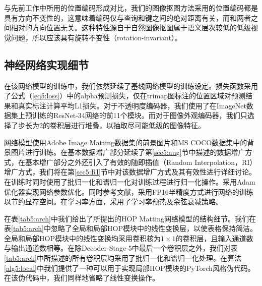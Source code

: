 与先前工作中所用的位置编码\cite{vaswani2017attention,dai2019transformer,ramachandran2019stand}形成对比，我们的图像抠图方法采用的位置编码都是具有方向不变性的，这意味着编码仅与查询和键之间的绝对距离有关，而和两者之间相对的方向位置无关。这种特性源自于自然图像抠图属于语义层次较低的低级视觉问题，所以应该具有旋转不变性（rotation-invariant）。

\subsection{神经网络实现细节}

在该网络模型的训练中，我们依然延续了基线网络模型的训练设定。损失函数采用了公式（\ref{eq5:loss}）中的alpha预测损失，仅在trimap图标注的位置区域对预测结果和真实标注计算平均L1损失。对于不透明度编码器，我们使用了在ImageNet数据集\cite{russakovsky2015imagenet}上预训练的ResNet-34网络\cite{he2016deep}的前11个模块。而对于图像外观编码器，我们只选择了步长为2的卷积层进行堆叠，以抽取尽可能低级的图像特征。

网络模型使用Adobe Image Matting数据集\cite{xu2017deep}的前景图片和MS COCO数据集中的背景图片进行训练\cite{lin2014microsoft}。在基本数据增广部分延续了第\ref{sec5:aug}节中描述的数据增广方式，在基本增广部分之外还引入了有效的随即插值（Random Interpolation，RI）增广方式，我们将在第\ref{sec5:RI}节中对该数据增广方式及其有效性进行详细讨论。在训练时同时使用了批归一化\cite{ioffe2015batch}和谱归一化\cite{miyato2018spectral}对训练过程进行归一化操作。采用Adam优化器\cite{kingma2014adam}实现网络参数优化。同时参考文献\parencite{he2019bag}，采用FP16半精度方式进行网络的训练以节约显存空间。在学习率方面，采用了学习率预热\cite{goyal2017accurate}及余弦衰减\cite{loshchilov2016sgdr}策略。

在表\ref{tab5:arch}中我们给出了所提出的HOP Matting网络模型的结构细节。我们在表\ref{tab5:arch}中忽略了全局和局部HOP模块中的线性变换层，以使表格保持简洁。全局和局部HOP模块中的线性变换均采用卷积核为$1\times 1$的卷积层，且输入通道数与输出通道数相等。在除Decoder-Stage-5中最后一个卷积层之外，我们对表\ref{tab5:arch}中所描述的所有卷积层均采用了批归一化\cite{ioffe2015batch}和谱归一化\cite{miyato2018spectral}处理。在算法\ref{alg5:local}中我们提供了一种可以用于实现局部HOP模块的PyTorch\cite{paszke2017automatic}风格伪代码。在该伪代码中，我们同样地省略了线性变换操作。

